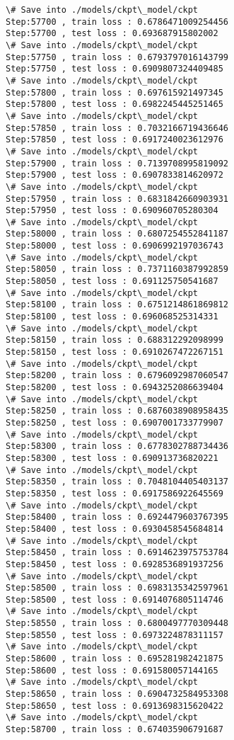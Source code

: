 \documentclass[11pt]{article}
\begin{document}
\begin{Verbatim}[commandchars=\\\{\}]
\# Save into ./models/ckpt\_model/ckpt
Step:57700 , train loss : 0.6786471009254456
Step:57700 , test loss : 0.693687915802002
\# Save into ./models/ckpt\_model/ckpt
Step:57750 , train loss : 0.6793797016143799
Step:57750 , test loss : 0.6909807324409485
\# Save into ./models/ckpt\_model/ckpt
Step:57800 , train loss : 0.697615921497345
Step:57800 , test loss : 0.6982245445251465
\# Save into ./models/ckpt\_model/ckpt
Step:57850 , train loss : 0.7032166719436646
Step:57850 , test loss : 0.6917240023612976
\# Save into ./models/ckpt\_model/ckpt
Step:57900 , train loss : 0.7139708995819092
Step:57900 , test loss : 0.6907833814620972
\# Save into ./models/ckpt\_model/ckpt
Step:57950 , train loss : 0.6831842660903931
Step:57950 , test loss : 0.690960705280304
\# Save into ./models/ckpt\_model/ckpt
Step:58000 , train loss : 0.6807254552841187
Step:58000 , test loss : 0.6906992197036743
\# Save into ./models/ckpt\_model/ckpt
Step:58050 , train loss : 0.7371160387992859
Step:58050 , test loss : 0.691125750541687
\# Save into ./models/ckpt\_model/ckpt
Step:58100 , train loss : 0.6751214861869812
Step:58100 , test loss : 0.696068525314331
\# Save into ./models/ckpt\_model/ckpt
Step:58150 , train loss : 0.688312292098999
Step:58150 , test loss : 0.6910267472267151
\# Save into ./models/ckpt\_model/ckpt
Step:58200 , train loss : 0.6796092987060547
Step:58200 , test loss : 0.6943252086639404
\# Save into ./models/ckpt\_model/ckpt
Step:58250 , train loss : 0.6876038908958435
Step:58250 , test loss : 0.6907001733779907
\# Save into ./models/ckpt\_model/ckpt
Step:58300 , train loss : 0.6778302788734436
Step:58300 , test loss : 0.690913736820221
\# Save into ./models/ckpt\_model/ckpt
Step:58350 , train loss : 0.7048104405403137
Step:58350 , test loss : 0.6917586922645569
\# Save into ./models/ckpt\_model/ckpt
Step:58400 , train loss : 0.6924479603767395
Step:58400 , test loss : 0.6930458545684814
\# Save into ./models/ckpt\_model/ckpt
Step:58450 , train loss : 0.6914623975753784
Step:58450 , test loss : 0.6928536891937256
\# Save into ./models/ckpt\_model/ckpt
Step:58500 , train loss : 0.6983135342597961
Step:58500 , test loss : 0.6914076805114746
\# Save into ./models/ckpt\_model/ckpt
Step:58550 , train loss : 0.6800497770309448
Step:58550 , test loss : 0.6973224878311157
\# Save into ./models/ckpt\_model/ckpt
Step:58600 , train loss : 0.695281982421875
Step:58600 , test loss : 0.691580057144165
\# Save into ./models/ckpt\_model/ckpt
Step:58650 , train loss : 0.6904732584953308
Step:58650 , test loss : 0.6913698315620422
\# Save into ./models/ckpt\_model/ckpt
Step:58700 , train loss : 0.674035906791687

\end{Verbatim}
\end{document}
